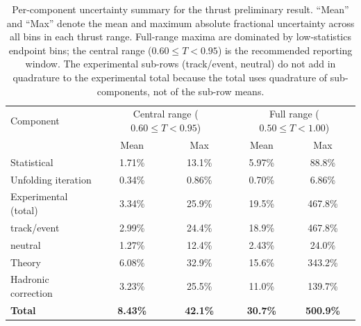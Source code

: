 \begin{table}[t!]
\centering
\begin{tabular}{l c c c c}
\hline
Component & \multicolumn{2}{c}{Central range ($0.60\le T<0.95$)} & \multicolumn{2}{c}{Full range ($0.50\le T<1.00$)} \\
 & Mean & Max & Mean & Max \\
\hline
Statistical          & 1.71\% & 13.1\% & 5.97\% & 88.8\% \\
Unfolding iteration  & 0.34\% &  0.86\% & 0.70\% & 6.86\% \\
Experimental (total) & 3.34\% & 25.9\% & 19.5\% & 467.8\% \\
\quad track/event    & 2.99\% & 24.4\% & 18.9\% & 467.8\% \\
\quad neutral        & 1.27\% & 12.4\% &  2.43\% & 24.0\% \\
Theory               & 6.08\% & 32.9\% & 15.6\% & 343.2\% \\
Hadronic correction  & 3.23\% & 25.5\% & 11.0\% & 139.7\% \\
\hline
\textbf{Total}       & \textbf{8.43\%} & \textbf{42.1\%} & \textbf{30.7\%} & \textbf{500.9\%} \\
\hline
\end{tabular}
\normalsize
\caption{Per-component uncertainty summary for the thrust preliminary result. ``Mean'' and ``Max'' denote the mean and maximum absolute fractional uncertainty across all bins in each thrust range. Full-range maxima are dominated by low-statistics endpoint bins; the central range ($0.60\le T < 0.95$) is the recommended reporting window. The experimental sub-rows (track/event, neutral) do not add in quadrature to the experimental total because the total uses quadrature of sub-components, not of the sub-row means.}
\label{tab:uncertainty_breakdown}
\end{table}
